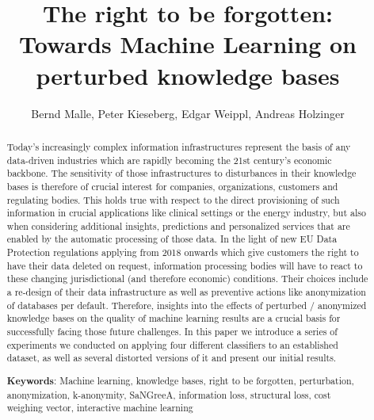 \documentclass{llncs}
\begin{document}
\title{The right to be forgotten:\\
Towards Machine Learning on perturbed knowledge bases}

\author{Bernd Malle, Peter Kieseberg, Edgar Weippl, Andreas Holzinger}

	
\maketitle

\begin{abstract}


Today's increasingly complex information infrastructures represent the basis of any data-driven industries which are rapidly becoming the 21st century's economic backbone. The sensitivity of those infrastructures to disturbances in their knowledge bases is therefore of crucial interest for companies, organizations, customers and regulating bodies. This holds true with respect to the direct provisioning of such information in crucial applications like clinical settings or the energy industry, but also when considering additional insights, predictions and personalized services that are enabled by the automatic processing of those data. In the light of new EU Data Protection regulations applying from 2018 onwards which give customers the right to have their data deleted on request, information processing bodies will have to react to these changing jurisdictional (and therefore economic) conditions. Their choices include a re-design of their data infrastructure as well as preventive actions like anonymization of databases per default. Therefore, insights into the effects of perturbed / anonymized knowledge bases on the quality of machine learning results are a crucial basis for successfully facing those future challenges. In this paper we introduce a series of experiments we conducted on applying four different classifiers to an established dataset, as well as several distorted versions of it and present our initial results.


\medskip

\textbf{Keywords}: Machine learning, knowledge bases, right to be forgotten, perturbation, anonymization, k-anonymity, SaNGreeA, information loss, structural loss, cost weighing vector, interactive machine learning


\end{abstract}
\end{document}
